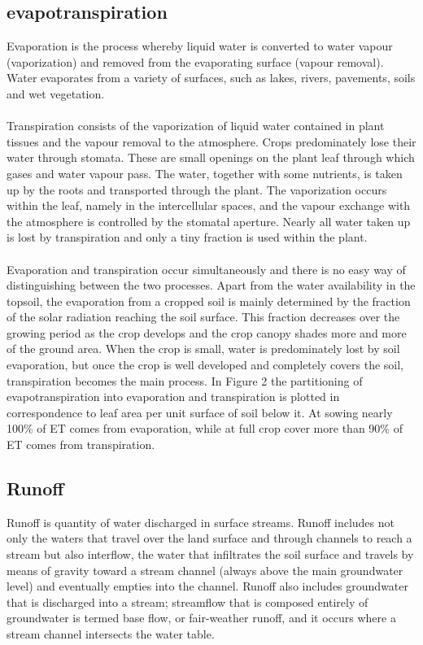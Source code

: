 \subsection{evapotranspiration}
Evaporation is the process whereby liquid water is converted to water vapour (vaporization) and removed from the evaporating surface (vapour removal). Water evaporates from a variety of surfaces, such as lakes, rivers, pavements, soils and wet vegetation.\\\\
Transpiration consists of the vaporization of liquid water contained in plant tissues and the vapour removal to the atmosphere. Crops predominately lose their water through stomata. These are small openings on the plant leaf through which gases and water vapour pass. The water, together with some nutrients, is taken up by the roots and transported through the plant. The vaporization occurs within the leaf, namely in the intercellular spaces, and the vapour exchange with the atmosphere is controlled by the stomatal aperture. Nearly all water taken up is lost by transpiration and only a tiny fraction is used within the plant.\\\\
Evaporation and transpiration occur simultaneously and there is no easy way of distinguishing between the two processes. Apart from the water availability in the topsoil, the evaporation from a cropped soil is mainly determined by the fraction of the solar radiation reaching the soil surface. This fraction decreases over the growing period as the crop develops and the crop canopy shades more and more of the ground area. When the crop is small, water is predominately lost by soil evaporation, but once the crop is well developed and completely covers the soil, transpiration becomes the main process. In Figure 2 the partitioning of evapotranspiration into evaporation and transpiration is plotted in correspondence to leaf area per unit surface of soil below it. At sowing nearly 100\% of ET comes from evaporation, while at full crop cover more than 90\% of ET comes from transpiration.\cite{allen1998crop}
\subsection{Runoff}
Runoff is quantity of water discharged in surface streams. Runoff includes not only the waters that travel over the land surface and through channels to reach a stream but also interflow, the water that infiltrates the soil surface and travels by means of gravity toward a stream channel (always above the main groundwater level) and eventually empties into the channel. Runoff also includes groundwater that is discharged into a stream; streamflow that is composed entirely of groundwater is termed base flow, or fair-weather runoff, and it occurs where a stream channel intersects the water table.
